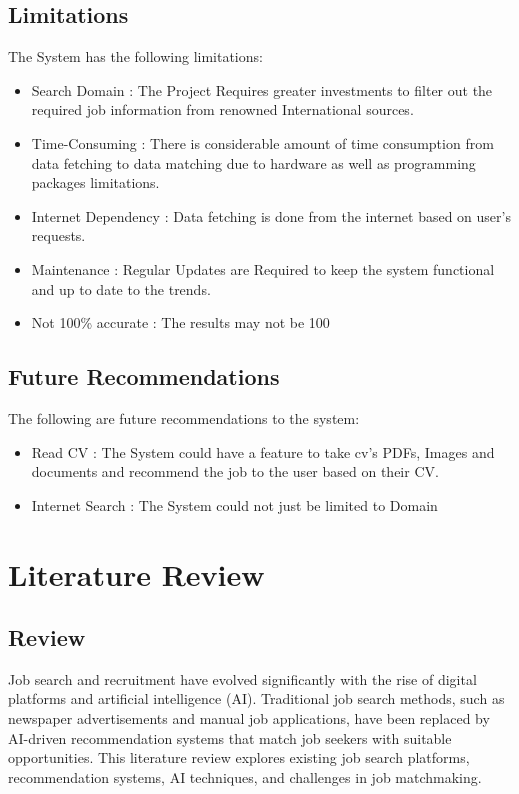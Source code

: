 \documentclass[a4paper,12pt]{report}
\begin{document}
        \section{Limitations}
        The System has the following limitations:
        \begin{itemize}
            \item Search Domain : The Project Requires greater investments to filter out the required job information from renowned International sources.
            \item Time-Consuming : There is considerable amount of time consumption from data fetching to data matching due to hardware as well as programming packages limitations.
            \item Internet Dependency : Data fetching is done from the internet based on user’s requests.
            \item Maintenance : Regular Updates are Required to keep the system functional and up to date to the trends.
            \item Not 100\% accurate : The results may not be 100%

        \end{itemize}

        \section{Future Recommendations}
        The following are future recommendations to the system:
        \begin{itemize}
            \item Read CV : The System could have a feature to take cv's PDFs, Images and documents and recommend the job to the user based on their CV.
            \item Internet Search : The System could not just be limited to Domain
        \end{itemize}
        \newpage

        \chapter{Literature Review}
        \section{Review}
        Job search and recruitment have evolved significantly with the rise of digital platforms and artificial intelligence (AI). Traditional job search methods, such as newspaper advertisements and manual job applications, have been replaced by AI-driven recommendation systems that match job seekers with suitable opportunities. This literature review explores existing job search platforms, recommendation systems, AI techniques, and challenges in job matchmaking.
\end{document}
